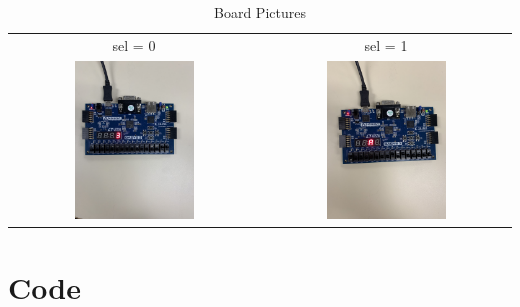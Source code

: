 \documentclass[11pt]{article}
\newcommand{\Verilog}[2][]{%
	
}
\begin{document}
\begin{table}[h]\centering
	\begin{tabular}{cc}
		sel = 0 & sel = 1 \\
		\includegraphics [width=0.5\textwidth,trim=0 0 0 0, clip, angle = 270]{Basys3_pic0} &
		\includegraphics [width=0.5\textwidth,trim=0 0 0 0, clip, angle = 270]{Basys3_pic1} \\
	\end{tabular}
	\caption{Board Pictures}
	\label{fig:sim_with_table}
\end{table}




\section*{Code}

\Verilog{Lab06/systemverilog/mux2_4b.sv}

\Verilog{Lab06/systemverilog/mux2_4b_test.sv}

\Verilog{Lab06/systemverilog/sseg_decoder.sv}

\Verilog{Lab06/systemverilog/sseg_decoder_test.sv}

\Verilog{Lab06/systemverilog/sseg1.sv}

\Verilog{Lab06/systemverilog/sseg1_test.sv}
\end{document}
